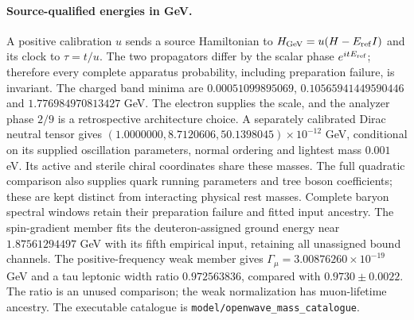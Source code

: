 \paragraph{Source-qualified energies in GeV.}
A positive calibration $u$ sends a source Hamiltonian to
$H_{\rm GeV}=u(H-E_{\rm ref}I)$ and its clock to $\tau=t/u$.
The two propagators differ by the scalar phase $e^{itE_{\rm ref}}$;
therefore every complete apparatus probability, including preparation
failure, is invariant. The charged band minima are
$0.00051099895069$, $0.10565941449590446$ and $1.776984970813427$ GeV.
The electron supplies the scale, and the analyzer phase $2/9$ is a
retrospective architecture choice. A separately calibrated Dirac neutral
tensor gives $(1.0000000,8.7120606,50.1398045)\times10^{-12}$ GeV,
conditional on its supplied oscillation parameters, normal ordering and
lightest mass $0.001$ eV. Its active and sterile chiral coordinates share
these masses. The full quadratic comparison also supplies quark running
parameters and tree boson coefficients; these are kept distinct from
interacting physical rest masses. Complete baryon spectral windows retain
their preparation failure and fitted input ancestry.
The spin-gradient member fits the deuteron-assigned ground energy
near $1.87561294497$ GeV with its fifth empirical input, retaining all
unassigned bound channels. The positive-frequency weak member gives
$\Gamma_\mu=3.00876260\times10^{-19}$ GeV and a tau leptonic
width ratio $0.972563836$, compared with $0.9730\pm0.0022$.
The ratio is an unused comparison; the weak normalization has
muon-lifetime ancestry. The executable catalogue is
\texttt{model/openwave\_mass\_catalogue}.
